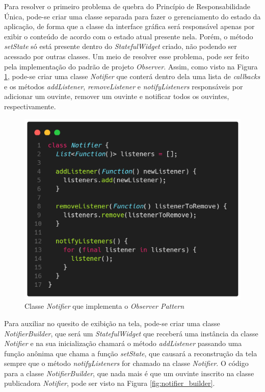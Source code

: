 \documentclass[12pt, %
openright, 
oneside, %
a4paper,    %
brazil]{facom-ufu-abntex2}
\begin{document}
Para resolver o primeiro problema de quebra do Princípio de Responsabilidade Única, pode-se criar uma classe separada para fazer o gerenciamento do estado da aplicação, de forma que a classe da interface gráfica será responsável apenas por exibir o conteúdo de acordo com o estado atual presente nela. Porém, o método \textit{setState} só está presente dentro do \textit{StatefulWidget} criado, não podendo ser acessado por outras classes. Um meio de resolver esse problema, pode ser feito pela implementação do padrão de projeto \textit{Observer}. Assim, como visto na Figura \ref{fig:notifier}, pode-se criar uma classe \textit{Notifier} que conterá dentro dela uma lista de \textit{callbacks} e os métodos \textit{addListener}, \textit{removeListener} e \textit{notifyListeners} responsáveis por adicionar um ouvinte, remover um ouvinte e notificar todos os ouvintes, respectivamente.

\begin{figure}[ht]
    \centering
    \includegraphics[width=.65\textwidth, trim={0 30 0 100}, clip]{figures/states/notifier.png}
    \caption{Classe \textit{Notifier} que implementa o \textit{Observer Pattern}}
    \label{fig:notifier}
\end{figure}
Para auxiliar no quesito de exibição na tela, pode-se criar uma classe \textit{NotifierBuilder}, que será um \textit{StatefulWidget} que receberá uma instância da classe \textit{Notifier} e na sua inicialização chamará o método \textit{addListener} passando uma função anônima que chama a função \textit{setState}, que causará a reconstrução da tela sempre que o método \textit{notifyListeners} for chamado na classe \textit{Notifier}. O código para a classe \textit{NotifierBuilder}, que nada mais é que um ouvinte inscrito na classe publicadora \textit{Notifier}, pode ser visto na Figura \ref{fig:notifier_builder}.
\end{document}
